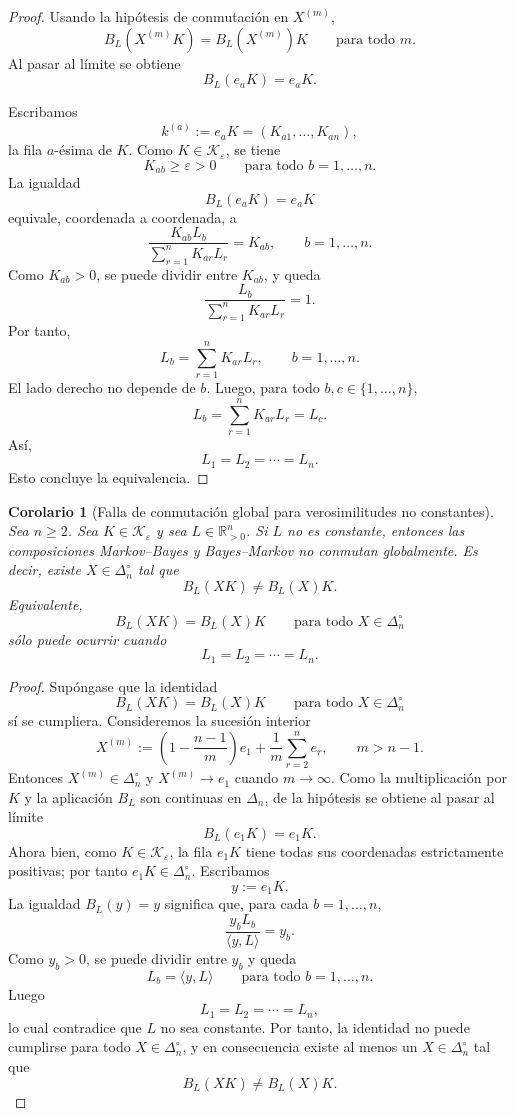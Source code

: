 ﻿\documentclass[12pt]{article}
\newtheorem{corolario}{Corolario}[section]
\begin{document}
\begin{proof}
Usando la hipótesis de conmutación en \(X^{(m)}\),
\[
B_L(X^{(m)}K)=B_L(X^{(m)})K
\qquad
\text{para todo }m.
\]
Al pasar al límite se obtiene
\[
B_L(e_aK)=e_aK.
\]

Escribamos
\[
k^{(a)}:=e_aK=(K_{a1},\dots,K_{an}),
\]
la fila \(a\)-ésima de \(K\). Como \(K\in\mathcal K_\varepsilon\), se tiene
\[
K_{ab}\ge \varepsilon>0
\qquad
\text{para todo }b=1,\dots,n.
\]
La igualdad
\[
B_L(e_aK)=e_aK
\]
equivale, coordenada a coordenada, a
\[
\frac{K_{ab}L_b}{\sum_{r=1}^nK_{ar}L_r}
=
K_{ab},
\qquad b=1,\dots,n.
\]
Como \(K_{ab}>0\), se puede dividir entre \(K_{ab}\), y queda
\[
\frac{L_b}{\sum_{r=1}^nK_{ar}L_r}
=
1.
\]
Por tanto,
\[
L_b
=
\sum_{r=1}^nK_{ar}L_r,
\qquad b=1,\dots,n.
\]
El lado derecho no depende de \(b\). Luego, para todo \(b,c\in\{1,\dots,n\}\),
\[
L_b
=
\sum_{r=1}^nK_{ar}L_r
=
L_c.
\]
Así,
\[
L_1=L_2=\cdots=L_n.
\]
Esto concluye la equivalencia.
\end{proof}


\begin{corolario}[Falla de conmutación global para verosimilitudes no constantes]
\label{cor:falla_conmutacion_global_L_no_constante}
Sea \(n\ge 2\). Sea \(K\in\mathcal K_\varepsilon\) y sea \(L\in\mathbb R_{>0}^n\). Si \(L\) no es constante, entonces las composiciones Markov--Bayes y Bayes--Markov no conmutan globalmente. Es decir, existe \(X\in\Delta_n^\circ\) tal que
\[
B_L(XK)\neq B_L(X)K.
\]
Equivalente,
\[
B_L(XK)=B_L(X)K
\qquad
\text{para todo }X\in\Delta_n^\circ
\]
sólo puede ocurrir cuando
\[
L_1=L_2=\cdots=L_n.
\]
\end{corolario}

\begin{proof}
Supóngase que la identidad
\[
B_L(XK)=B_L(X)K
\qquad
\text{para todo }X\in\Delta_n^\circ
\]
sí se cumpliera. Consideremos la sucesión interior
\[
X^{(m)}
:=
\left(1-\frac{n-1}{m}\right)e_1
+
\frac1m\sum_{r=2}^n e_r,
\qquad m>n-1.
\]
Entonces \(X^{(m)}\in\Delta_n^\circ\) y \(X^{(m)}\to e_1\) cuando \(m\to\infty\). Como la multiplicación por \(K\) y la aplicación \(B_L\) son continuas en \(\Delta_n\), de la hipótesis se obtiene al pasar al límite
\[
B_L(e_1K)=e_1K.
\]
Ahora bien, como \(K\in\mathcal K_\varepsilon\), la fila \(e_1K\) tiene todas sus coordenadas estrictamente positivas; por tanto \(e_1K\in\Delta_n^\circ\). Escribamos
\[
y:=e_1K.
\]
La igualdad \(B_L(y)=y\) significa que, para cada \(b=1,\dots,n\),
\[
\frac{y_bL_b}{\langle y,L\rangle}
=
y_b.
\]
Como \(y_b>0\), se puede dividir entre \(y_b\) y queda
\[
L_b=\langle y,L\rangle
\qquad
\text{para todo }b=1,\dots,n.
\]
Luego
\[
L_1=L_2=\cdots=L_n,
\]
lo cual contradice que \(L\) no sea constante. Por tanto, la identidad no puede cumplirse para todo \(X\in\Delta_n^\circ\), y en consecuencia existe al menos un \(X\in\Delta_n^\circ\) tal que
\[
B_L(XK)\neq B_L(X)K.
\]
\end{proof}
\end{document}
